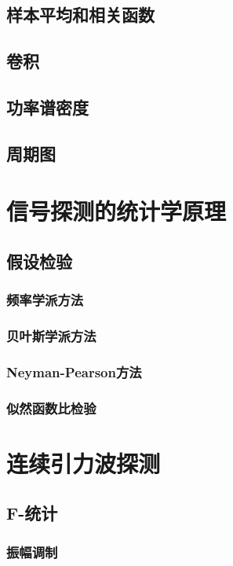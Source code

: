 \subsection{样本平均和相关函数}
\subsection{卷积}
\subsection{功率谱密度}
\subsection{周期图}

\section{信号探测的统计学原理}
\subsection{假设检验}
\subsubsection{频率学派方法}
\subsubsection{贝叶斯学派方法}
\subsubsection{Neyman-Pearson方法}
\subsubsection{似然函数比检验}

\section{连续引力波探测}
\subsection{F-统计}
\subsubsection{振幅调制}
